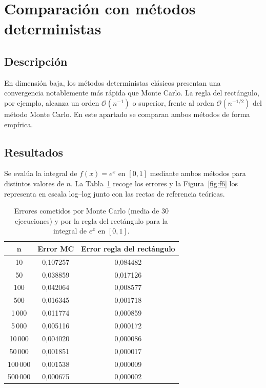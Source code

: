 \documentclass[11pt,a4paper]{article}
\newcommand{\cab}{\rowcolor{cabecera}}
\begin{document}
\section{Comparación con métodos deterministas}

\subsection{Descripción}
En dimensión baja, los métodos deterministas clásicos presentan una convergencia notablemente más rápida que Monte Carlo. La regla del rectángulo, por ejemplo, alcanza un orden $\mathcal{O}(n^{-1})$ o superior, frente al orden $\mathcal{O}(n^{-1/2})$ del método Monte Carlo. En este apartado se comparan ambos métodos de forma empírica.

\subsection{Resultados}
Se evalúa la integral de $f(x)=e^x$ en $[0,1]$ mediante ambos métodos para distintos valores de $n$. La Tabla~\ref{tab:t9} recoge los errores y la Figura~\ref{fig:f6} los representa en escala log–log junto con las rectas de referencia teóricas.

\begin{table}[H]
\centering
\caption{Errores cometidos por Monte Carlo (media de 30 ejecuciones) y por la regla del rectángulo para la integral de $e^x$ en $[0,1]$.}\label{tab:t9}
\begin{tabular}{ccc}
\toprule
\cab $\boldsymbol{n}$ & \textbf{Error MC} & \textbf{Error regla del rectángulo}\\
\midrule
10 & 0,107257 & 0,084482\\
50 & 0,038859 & 0,017126\\
100 & 0,042064 & 0,008577\\
500 & 0,016345 & 0,001718\\
1\,000 & 0,011774 & 0,000859\\
5\,000 & 0,005116 & 0,000172\\
10\,000 & 0,004020 & 0,000086\\
50\,000 & 0,001851 & 0,000017\\
100\,000 & 0,001538 & 0,000009\\
500\,000 & 0,000675 & 0,000002\\
\bottomrule
\end{tabular}
\end{table}
\end{document}
